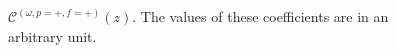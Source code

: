 \documentclass[]{report}
\begin{document}
\begin{figure}[H]
\begin{minipage}{.51\linewidth}
\centering
{}
\end{minipage}%
\begin{minipage}{.51\linewidth}
\centering
{}
\end{minipage}
\caption{$ \mathcal{C}^{(\omega,p=+,f=+)}(z) $. The values of these coefficients are in an arbitrary unit. }
\label{Cz}
\end{figure}
\end{document}
